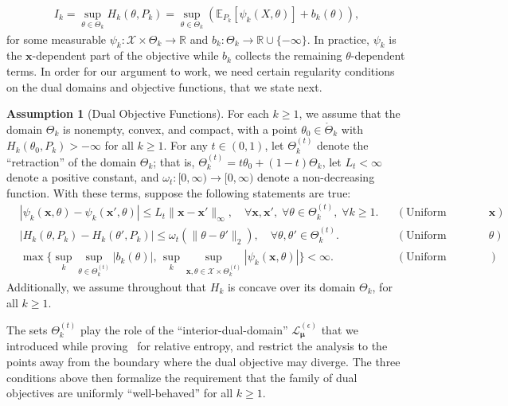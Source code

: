 \documentclass{article}
\theoremstyle{plain}
\theoremstyle{definition}
\newtheorem{assumption}[assumption]{Assumption}
\newcommand{\lrp}[1]{\left( #1 \right)}
\newcommand{\R}{\mathbb{R}}
\newcommand{\calX}{\mathcal X}
\newcommand{\calL}{\mathcal L}
\newcommand{\xvec}{\mathbf{x}}
\newcommand{\boldmu}{\boldsymbol{\mu}}
\newcommand{\epsdualdomain}{\calL_{\boldmu}^{(\epsilon)}}
\begin{document}
\begin{align}
        I_k =   \sup_{\theta \in \Theta_k}  H_k(\theta, P_k) = \sup_{\theta \in \Theta_k} \lrp{\mathbb{E}_{P_k}[\psi_k(X, \theta)] + b_k(\theta) }, 
\end{align}
for some measurable $\psi_k:\calX \times \Theta_k \to \R$ and $b_k: \Theta_k \to \R \cup \{-\infty\}$. In practice, $\psi_k$ is the $\xvec$-dependent part of the objective while $b_k$ collects the remaining $\theta$-dependent terms. 
In order for our argument to work, we need certain regularity conditions on the dual domains and objective functions, that we state next. 
\begin{assumption}[Dual Objective Functions]
    \label{assump:general-dual-function} 
    For each $k \geq 1$, we assume that the domain $\Theta_k$ is nonempty, convex, and compact, with a point $\theta_0 \in \mathring{\Theta}_k$ with $H_k(\theta_0, P_k) > -\infty$ for all $k \geq 1$. 
    For any $t \in (0, 1)$, let $\Theta_k^{(t)}$ denote the ``retraction'' of the domain $\Theta_k$; that is, $\Theta_k^{(t)} = t \theta_0 + (1-t) \Theta_k$, let $L_t < \infty$ denote a positive constant, and $\omega_t: [0, \infty) \to [0, \infty)$ denote a non-decreasing function. With these terms, suppose the following statements are true: 
    \begin{align}
        &|\psi_k(\xvec, \theta) - \psi_k(\xvec', \theta)| \leq L_t \|\xvec - \xvec'\|_\infty, \quad \forall \xvec, \xvec', \; \forall \theta \in \Theta_k^{(t)}, \; \forall k \geq 1. && (\text{Uniform Lipschitz in $\xvec$}) \\
        &|H_k(\theta, P_k) - H_k(\theta', P_k)| \leq \omega_t(\|\theta-\theta'\|_2), \quad \forall \theta, \theta' \in \Theta_k^{(t)}. && (\text{Uniform Continuity in $\theta$}) \\
        & \max \bigg\{ \sup_{k} \sup_{\theta \in \Theta_k^{(t)}} |b_k(\theta)|, \, \sup_{k} \sup_{\xvec, \theta \in \calX \times \Theta_k^{(t)}} |\psi_k(\xvec, \theta)| \bigg\}< \infty. && (\text{Uniform Boundedness}) 
    \end{align}
    Additionally, we assume throughout that $H_k$ is concave over its domain $\Theta_k$, for all $k \geq 1$.  
\end{assumption}

The sets $\Theta_k^{(t)}$ play the role of the ``interior-dual-domain'' $\epsdualdomain$ that we introduced while proving~ for relative entropy, and restrict the analysis to the points away from the boundary where the dual objective may diverge. The three conditions above then formalize the requirement that the family of dual objectives are uniformly ``well-behaved'' for all $k \geq 1$. 
\end{document}
